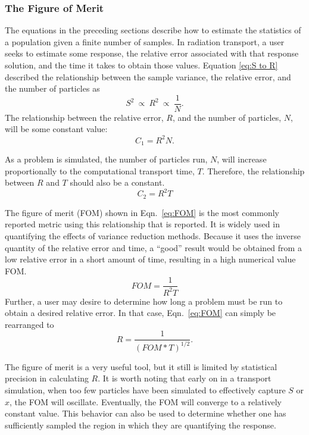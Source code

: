 \subsubsection{The Figure of Merit}
\label{subsubsec:FOM}

The equations in the preceding sections describe how to estimate the statistics
of a population given a finite number of samples. In radiation transport, a
user seeks to estimate some response, the relative error associated with that
response solution, and the time it takes to obtain those values. Equation
\eqref{eq:S to R} described the relationship between the sample variance, the
relative error, and the number of particles as
\begin{equation*}
S^2\:\propto\: R^2\:\propto\:\frac{1}{N} .
\end{equation*}
The relationship between the relative error, $R$, and the number of particles, $N$,
will be some constant value:
\begin{equation*}
 C_1 = R^2N .
\end{equation*}

As a problem is simulated, the number of particles run, $N$, will increase
proportionally to the computational transport time, $T$. Therefore, the
relationship between $R$ and $T$ should also be a constant.
\begin{equation*}
  C_2 = R^2T
\end{equation*}

The figure of merit (FOM) shown in Eqn.\ \eqref{eq:FOM}
is the most commonly reported metric using this relationship that is reported.
It is widely used in quantifying the effects of variance reduction methods.
Because it uses the inverse quantity of the relative error and time, a
``good'' result would be obtained from a low relative error in a short amount of
time, resulting in a high numerical value FOM.
\begin{equation}
FOM=\frac { 1 }{ R^{ 2 }T }
\label{eq:FOM}
\end{equation}
Further, a user may desire to determine how long a problem must be run to obtain
a desired relative error. In that case, Eqn.\ \eqref{eq:FOM} can simply be
rearranged to
\begin{equation*}
  R = \frac{1}{(FOM*T)^{1/2}} .
\end{equation*}

The figure of merit is a very useful tool, but it still is limited by statistical
precision in calculating $R$.
It is worth noting that early on in a transport simulation,
when too few particles have been simulated to
effectively capture $S$ or $\hat{x}$, the FOM will oscillate.
Eventually, the FOM will converge to a relatively constant value. This behavior can
also be used to determine whether one has sufficiently sampled the
region in which they are quantifying the response.

